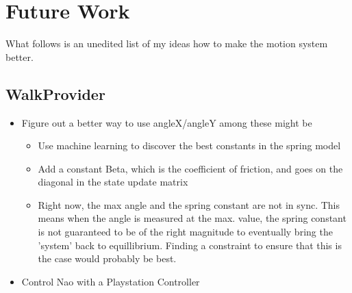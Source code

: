 \documentclass[11pt]{article}
\begin{document}
\section{Future Work}
What follows is an unedited list of my ideas how to make the motion system better.
\subsection{WalkProvider}
\begin{itemize}
\item Figure out a better way to use angleX/angleY among these might be
\begin{itemize}
   \item Use machine learning to discover the best constants in the spring model
   \item Add a constant Beta, which is the coefficient of friction, and goes on
      the diagonal in the state update matrix
   \item Right now, the max angle and the spring constant are not in sync. This
      means when the angle is measured at the max. value, the spring constant
      is not guaranteed to be of the right magnitude to eventually bring the
      'system' back to equillibrium.  Finding a constraint to ensure that this
      is the case would probably be best.
\end{itemize}
\item Control Nao with a Playstation Controller
\end{itemize}
\end{document}
